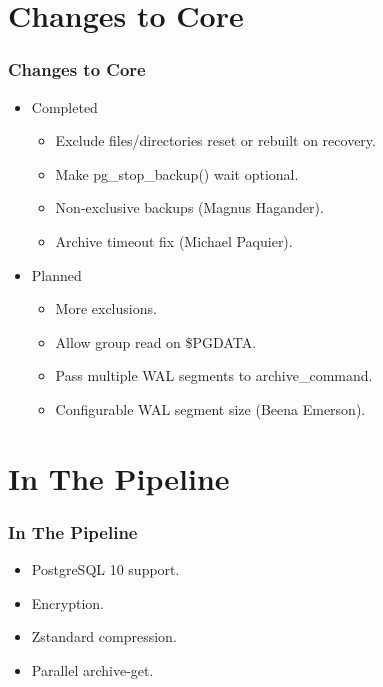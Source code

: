 \section{Changes to Core}

\begin{frame}
    \frametitle{Changes to Core}

    \begin{itemize}
        \item Completed

            \begin{itemize}
                \item Exclude files/directories reset or rebuilt on recovery.\pause
                \item Make pg\_stop\_backup() wait optional.\pause
                \item Non-exclusive backups (Magnus Hagander).\pause
                \item Archive timeout fix (Michael Paquier).\pause
            \end{itemize}

        \item Planned

            \begin{itemize}
                \item More exclusions.\pause
                \item Allow group read on \$PGDATA.\pause
                \item Pass multiple WAL segments to archive\_command.\pause
                \item Configurable WAL segment size (Beena Emerson).
            \end{itemize}
    \end{itemize}
\end{frame}

\section{In The Pipeline}

\begin{frame}
    \frametitle{In The Pipeline}

    \begin{itemize}
        \item PostgreSQL 10 support.\pause
        \item Encryption.\pause
        \item Zstandard compression.\pause
        \item Parallel archive-get.
    \end{itemize}
\end{frame}

